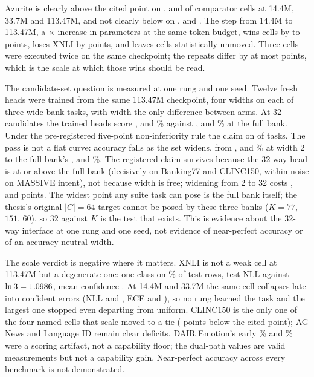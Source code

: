 Azurite is clearly above the cited point on \SuiteSmallClear, \SuiteMidClear{}
and \SuiteLargeClear{} of \SuiteComparatorCells{} comparator cells at 14.4M,
33.7M and 113.47M, and not clearly below on \SuiteSmallAtOrAboveThree,
\SuiteMidAtOrAboveThree{} and \SuiteLargeAtOrAbove. The step from 14.4M to
113.47M, a \SuiteLargeParamsRatio$\times$ increase in parameters at the same
token budget, wins \SuiteLargeWins{} cells by \SuiteLargeWinMin{} to
\SuiteLargeWinMax{} points, loses XNLI by \SuiteLargeLossAbs{} points, and leaves
\SuiteLargeUnmoved{} cells statistically unmoved. Three cells were executed twice
on the same checkpoint; the repeats differ by at most \SuiteReplicationMax{}
points, which is the scale at which those wins should be read.

The candidate-set question is measured at one rung and one seed. Twelve fresh heads
were trained from the same 113.47M checkpoint, four widths on each of three
wide-bank tasks, with width the only difference between arms. At 32 candidates
the trained heads score \EBankWThirtyTwo, \EClincWThirtyTwo{} and \EMassiveWThirtyTwo\% against
\EBankWK, \EClincWK{} and \EMassiveWK\% at the full bank. Under the
pre-registered five-point non-inferiority rule the claim \EAggregateVerdict{} on
\EHolds{} of \ETasks{} tasks. The pass is not a flat curve: accuracy falls as
the set widens, from \EBankWTwo, \EClincWTwo{} and \EMassiveWTwo\% at width 2 to
the full bank's \EBankWK, \EClincWK{} and \EMassiveWK\%. The registered claim
survives because the 32-way head is at or above the full bank (decisively on
Banking77 and CLINC150, within noise on MASSIVE intent), not because width is
free; widening from 2 to 32 costs \EBankCostTwoToThirtyTwo, \EClincCostTwoToThirtyTwo{} and
\EMassiveCostTwoToThirtyTwo{} points. The widest point any suite task can pose is the full
bank itself; the thesis's original $|C|=64$ target cannot be posed by these three
banks ($K=77$, $151$, $60$), so 32 against $K$ is the test that exists. This is
evidence about the 32-way interface at one rung and one seed, not evidence of
near-perfect accuracy or of an accuracy-neutral width.

The scale verdict is negative where it matters. XNLI is not a weak cell at
113.47M but a degenerate one: one class on \SuiteLargeXnliTopShare\% of test
rows, test NLL \SuiteLargeXnliNll{} against $\ln 3 = 1.0986$, mean
confidence \SuiteLargeXnliConf. At 14.4M and 33.7M the same cell collapses late
into confident errors (NLL \SuiteSmallXnliNll{} and \SuiteMidXnliNll, ECE
\SuiteSmallXnliEce{} and \SuiteMidXnliEce), so no rung learned the task and the
largest one stopped even departing from uniform. CLINC150 is the only one of the
four named cells that scale moved to a tie
(\SuiteLargeShortClinc{} points below the cited point); AG News and Language ID remain clear
deficits. DAIR Emotion's early \SuiteSmallPriorEmotion\% and
\SuiteMidPriorEmotion\% were a scoring artifact, not a capability floor; the
dual-path values are valid measurements but not a capability gain. Near-perfect
accuracy across every benchmark is not demonstrated.

